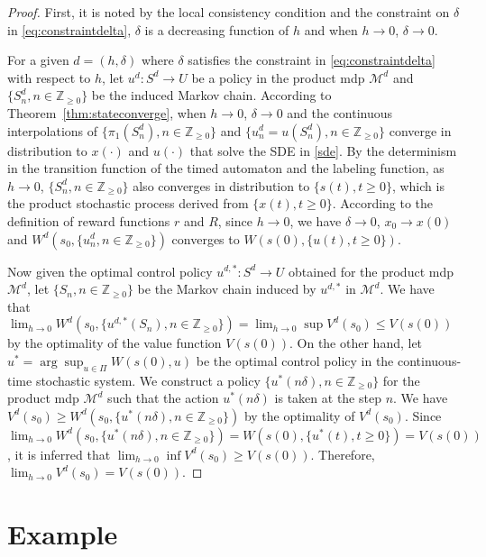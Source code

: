 \documentclass[letterpaper, 10 pt, conference]{ieeeconf}
\newcommand{\bbZ}{\mathbb{Z}_{\ge 0}}
\newcommand{\calM}{\mathcal{M}}
\begin{document}
\begin{proof}
  First, it is noted by the local consistency condition and the
  constraint on $\delta$ in \eqref{eq:constraintdelta}, $\delta$ is a
  decreasing function of $h$ and when $h \rightarrow 0$,
  $\delta \rightarrow 0$.
 

  For a given $d=(h,\delta)$ where $\delta$ satisfies the constraint
  in \eqref{eq:constraintdelta} with respect to $h$, let
  $u^d: S^d \rightarrow U$ be a policy in the product \ac{mdp}
  $\calM^d$ and $\{S^d_n, n \in \bbZ\} $ be the induced Markov chain.
  According to Theorem~\ref{thm:stateconverge}, when
  $h \rightarrow 0$, $\delta \rightarrow 0$ and the continuous
  interpolations of $\{\pi_1(S^d_n), n \in \bbZ\}$ and
  $\{u^d_n = u(S^d_n), n \in \bbZ\}$ converge in distribution to
  $x(\cdot)$ and $u(\cdot)$ that solve the SDE in \eqref{sde}. By the
  determinism in the transition function of the timed automaton and
  the labeling function, as $h\rightarrow 0$, $\{S^d_n, n \in \bbZ \}$
  also converges in distribution to $\{s(t), t\ge 0\}$, which is the
  product stochastic process derived from $\{x(t), t \ge 0\}$.
  According to the definition of reward functions $r$ and $R$, since
  $h \rightarrow 0$, we have $\delta \rightarrow 0$,
  $ x_0 \rightarrow x(0)$ and $W^d(s_0, \{u^d_n, n\in \bbZ\}) $
  converges to $W(s(0), \{u(t), t\ge 0\} )$.


  Now given the optimal control policy $u^{d,\ast}: S^d\rightarrow U$
  obtained for the product \ac{mdp} $\calM^d$, let
  $\{S_n, n \in \bbZ\}$ be the Markov chain induced by $u^{d,\ast}$ in
  $\calM^d$. We have that
  $\lim_{h \rightarrow 0}W^d (s_0, \{u^{d,\ast}(S_n), n\in \bbZ\}) =
  \lim_{h \rightarrow 0}\sup V^d(s_0)\le V(s(0))$
  by the optimality of the value function $V(s(0))$.  On the other
  hand, let $u^\ast = \arg\sup_{u\in \Pi} W(s(0),u)$ be the optimal
  control policy in the continuous-time stochastic system.  We
  construct a policy $\{u^\ast(n\delta), n \in \bbZ \}$ for the
  product \ac{mdp} $ \calM^d$ such that the action $u^\ast(n\delta) $
  is taken at the step $n$.  We have
  $V^d(s_0) \ge W^d(s_0, \{ u^\ast(n\delta), n \in \bbZ \})$ by the
  optimality of $V^d(s_0)$.  Since
  $\lim_{h \rightarrow 0} W^d(s_0, \{u^\ast(n\delta), n \in \bbZ \}) =
  W(s(0), \{u^\ast(t), t\ge 0 \})= V(s(0))$,
  it is inferred that
  $\lim_{h \rightarrow 0} \inf V^d(s_0) \ge V(s(0))$. Therefore,
  $\lim_{h \rightarrow 0 } V^d(s_0) = V(s(0))$.
\end{proof}
\section{Example}
\end{document}
